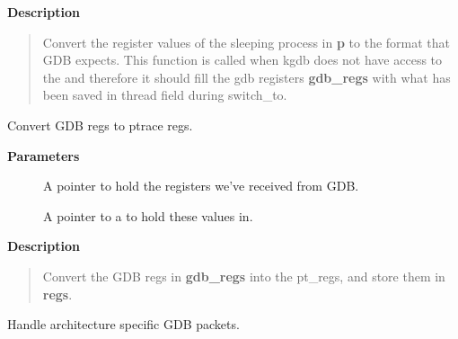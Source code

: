 \documentclass[a4paper,8pt,english]{sphinxmanual}
\begin{document}
\textbf{Description}
\begin{quote}

Convert the register values of the sleeping process in \textbf{p} to
the format that GDB expects.
This function is called when kgdb does not have access to the
 and therefore it should fill the gdb registers
\textbf{gdb\_regs} with what has been saved in 
thread field during switch\_to.
\end{quote}

\begin{fulllineitems}
\label{dev-tools/kgdb:c.gdb_regs_to_pt_regs}
Convert GDB regs to ptrace regs.

\end{fulllineitems}


\textbf{Parameters}
\begin{description}
\item[{}] \leavevmode
A pointer to hold the registers we've received from GDB.

\item[{}] \leavevmode
A pointer to a  to hold these values in.

\end{description}

\textbf{Description}
\begin{quote}

Convert the GDB regs in \textbf{gdb\_regs} into the pt\_regs, and store them
in \textbf{regs}.
\end{quote}

\begin{fulllineitems}
\label{dev-tools/kgdb:c.kgdb_arch_handle_exception}
Handle architecture specific GDB packets.

\end{fulllineitems}
\end{document}
